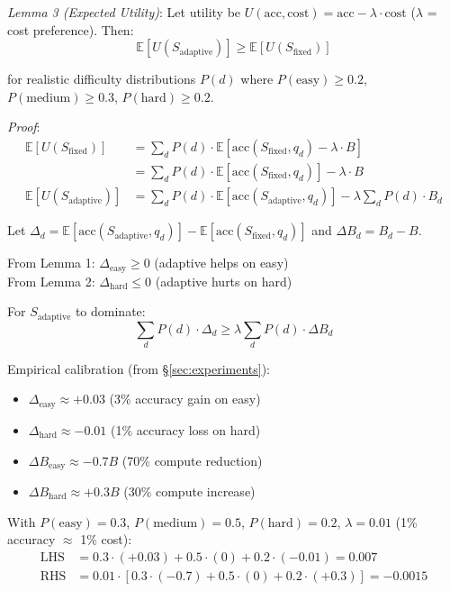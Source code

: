 \documentclass[10pt,preprint]{neurips_2024}
\begin{document}
\textit{Lemma 3 (Expected Utility)}: Let utility be $U(\text{acc}, \text{cost}) = \text{acc} - \lambda \cdot \text{cost}$ ($\lambda$ = cost preference). Then:
$$\mathbb{E}[U(S_{\text{adaptive}})] \geq \mathbb{E}[U(S_{\text{fixed}})]$$

for realistic difficulty distributions $P(d)$ where $P(\text{easy}) \geq 0.2$, $P(\text{medium}) \geq 0.3$, $P(\text{hard}) \geq 0.2$.

\textit{Proof}:
\begin{align*}
\mathbb{E}[U(S_{\text{fixed}})] &= \sum_d P(d) \cdot \mathbb{E}[\text{acc}(S_{\text{fixed}}, q_d) - \lambda \cdot B] \\
&= \sum_d P(d) \cdot \mathbb{E}[\text{acc}(S_{\text{fixed}}, q_d)] - \lambda \cdot B \\
\mathbb{E}[U(S_{\text{adaptive}})] &= \sum_d P(d) \cdot \mathbb{E}[\text{acc}(S_{\text{adaptive}}, q_d)] - \lambda \sum_d P(d) \cdot B_d
\end{align*}

Let $\Delta_d = \mathbb{E}[\text{acc}(S_{\text{adaptive}}, q_d)] - \mathbb{E}[\text{acc}(S_{\text{fixed}}, q_d)]$ and $\Delta B_d = B_d - B$.

From Lemma 1: $\Delta_{\text{easy}} \geq 0$ (adaptive helps on easy) \\
From Lemma 2: $\Delta_{\text{hard}} \leq 0$ (adaptive hurts on hard)

For $S_{\text{adaptive}}$ to dominate:
$$\sum_d P(d) \cdot \Delta_d \geq \lambda \sum_d P(d) \cdot \Delta B_d$$

Empirical calibration (from \S\ref{sec:experiments}):
\begin{itemize}
    \item $\Delta_{\text{easy}} \approx +0.03$ (3\% accuracy gain on easy)
    \item $\Delta_{\text{hard}} \approx -0.01$ (1\% accuracy loss on hard)
    \item $\Delta B_{\text{easy}} \approx -0.7B$ (70\% compute reduction)
    \item $\Delta B_{\text{hard}} \approx +0.3B$ (30\% compute increase)
\end{itemize}

With $P(\text{easy})=0.3$, $P(\text{medium})=0.5$, $P(\text{hard})=0.2$, $\lambda=0.01$ (1\% accuracy $\approx$ 1\% cost):
\begin{align*}
\text{LHS} &= 0.3 \cdot (+0.03) + 0.5 \cdot (0) + 0.2 \cdot (-0.01) = 0.007 \\
\text{RHS} &= 0.01 \cdot [0.3 \cdot (-0.7) + 0.5 \cdot (0) + 0.2 \cdot (+0.3)] = -0.0015
\end{align*}
\end{document}
